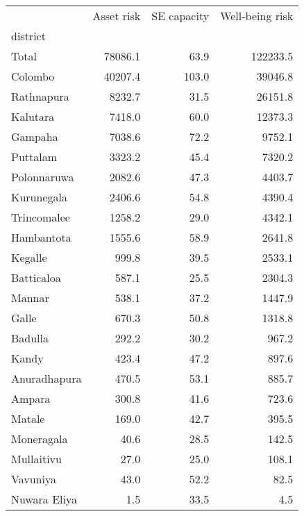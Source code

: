 \begin{tabular}{lrrr}
\toprule
{} &  Asset risk &  SE capacity &  Well-being risk \\
district     &             &              &                  \\
\midrule
Total        &     78086.1 &         63.9 &         122233.5 \\
Colombo      &     40207.4 &        103.0 &          39046.8 \\
Rathnapura   &      8232.7 &         31.5 &          26151.8 \\
Kalutara     &      7418.0 &         60.0 &          12373.3 \\
Gampaha      &      7038.6 &         72.2 &           9752.1 \\
Puttalam     &      3323.2 &         45.4 &           7320.2 \\
Polonnaruwa  &      2082.6 &         47.3 &           4403.7 \\
Kurunegala   &      2406.6 &         54.8 &           4390.4 \\
Trincomalee  &      1258.2 &         29.0 &           4342.1 \\
Hambantota   &      1555.6 &         58.9 &           2641.8 \\
Kegalle      &       999.8 &         39.5 &           2533.1 \\
Batticaloa   &       587.1 &         25.5 &           2304.3 \\
Mannar       &       538.1 &         37.2 &           1447.9 \\
Galle        &       670.3 &         50.8 &           1318.8 \\
Badulla      &       292.2 &         30.2 &            967.2 \\
Kandy        &       423.4 &         47.2 &            897.6 \\
Anuradhapura &       470.5 &         53.1 &            885.7 \\
Ampara       &       300.8 &         41.6 &            723.6 \\
Matale       &       169.0 &         42.7 &            395.5 \\
Moneragala   &        40.6 &         28.5 &            142.5 \\
Mullaitivu   &        27.0 &         25.0 &            108.1 \\
Vavuniya     &        43.0 &         52.2 &             82.5 \\
Nuwara Eliya &         1.5 &         33.5 &              4.5 \\
\bottomrule
\end{tabular}

